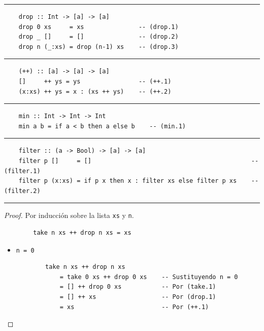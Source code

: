\documentclass[11pt,letterpaper]{article}
\begin{document}
\begin{enumerate}
\noindent
{\color{WildStrawberry} \rule{\linewidth}{0.4mm} }

\begin{verbatim}
    drop :: Int -> [a] -> [a]
    drop 0 xs     = xs               -- (drop.1)
    drop _ []     = []               -- (drop.2)
    drop n (_:xs) = drop (n-1) xs    -- (drop.3)
\end{verbatim}

\noindent
{\color{WildStrawberry} \rule{\linewidth}{0.4mm} }

\begin{verbatim}
    (++) :: [a] -> [a] -> [a]
    []     ++ ys = ys                -- (++.1)
    (x:xs) ++ ys = x : (xs ++ ys)    -- (++.2)
\end{verbatim}

\noindent
{\color{WildStrawberry} \rule{\linewidth}{0.4mm} }

\begin{verbatim}
    min :: Int -> Int -> Int
    min a b = if a < b then a else b    -- (min.1)
\end{verbatim}

\noindent
{\color{WildStrawberry} \rule{\linewidth}{0.4mm} }

\begin{verbatim}
    filter :: (a -> Bool) -> [a] -> [a]
    filter p []     = []                                            -- (filter.1)
    filter p (x:xs) = if p x then x : filter xs else filter p xs    -- (filter.2)
\end{verbatim}

\noindent
{\color{WildStrawberry} \rule{\linewidth}{0.4mm} }


\begin{proof} Por inducción sobre la lista \texttt{xs} y \texttt{n}.
    \hfill
    \begin{verbatim}
        take n xs ++ drop n xs = xs
    \end{verbatim}
    
    \begin{itemize}
    \item \texttt{n = 0}
    
    \begin{verbatim}
        take n xs ++ drop n xs
            = take 0 xs ++ drop 0 xs    -- Sustituyendo n = 0
            = [] ++ drop 0 xs           -- Por (take.1)
            = [] ++ xs                  -- Por (drop.1)
            = xs                        -- Por (++.1)
    \end{verbatim}


\end{itemize}
\end{proof}
\end{enumerate}
\end{document}
